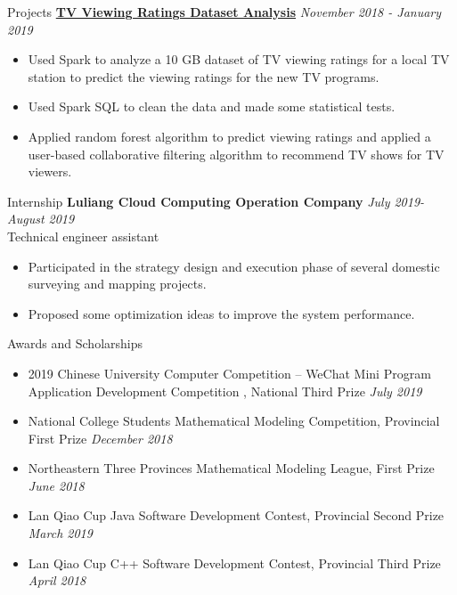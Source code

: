 \documentclass{resume} %
\begin{document}
\begin{rSection}{Projects}
{\bf \href{https://github.com/Mark-Fenng/TV-Ratings}{TV Viewing Ratings Dataset Analysis}} \hfill {\em November 2018 - January 2019}
\begin{itemize}[itemsep=-0.3em]
    \item Used Spark to analyze a 10 GB dataset of TV viewing ratings for a local TV station to predict the viewing ratings for the new TV programs.
    \item Used Spark SQL to clean the data and made some statistical tests.
    \item Applied random forest algorithm to predict viewing ratings and applied a user-based collaborative filtering algorithm to recommend TV shows for TV viewers. 
\end{itemize}
\end{rSection}
\begin{rSection}{Internship}
    {\bf Luliang Cloud Computing Operation Company} \hfill {\em July 2019- August 2019}\\
    {Technical engineer assistant}
        \begin{itemize}[itemsep=-0.3em]
            \item Participated in the strategy design and execution phase of several domestic surveying and mapping projects. 
            \item Proposed some optimization ideas to improve the system performance.
        \end{itemize}
\end{rSection}
\begin{rSection}{Awards and Scholarships} 
    \begin{itemize}[leftmargin=0pt,itemsep=-0.3em]
        \item { 2019 Chinese University Computer Competition – WeChat Mini Program Application Development Competition , National Third Prize} \hfill{\em July 2019}
        \item { National College Students Mathematical Modeling Competition, Provincial First Prize} \hfill{\em December 2018}
        \item { Northeastern Three Provinces Mathematical Modeling League, First Prize}  \hfill {\em June 2018}
        \item { Lan Qiao Cup Java Software Development Contest, Provincial Second Prize}  \hfill {\em March 2019}
        \item { Lan Qiao Cup C++ Software Development Contest, Provincial Third Prize}  \hfill {\em April 2018}
    \end{itemize}
\end{rSection}
\end{document}
